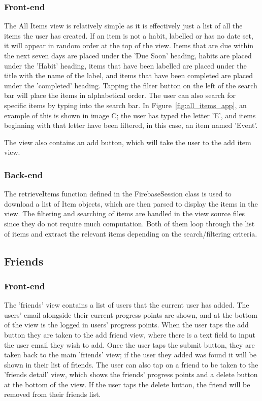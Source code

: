         \subsubsection{Front-end}
        The All Items view is relatively simple as it is effectively just a list of all the items the user has created.  If an item is not a habit, labelled or has no date set, it will appear in random order at the top of the view.  Items that are due within the next seven days are placed under the 'Due Soon' heading, habits are placed under the 'Habit' heading, items that have been labelled are placed under the title with the name of the label, and items that have been completed are placed under the 'completed' heading.  Tapping the filter button on the left of the search bar will place the items in alphabetical order.  The user can also search for specific items by typing into the search bar.  In Figure~\ref{fig:all_items_app}, an example of this is shown in image C; the user has typed the letter 'E', and items beginning with that letter have been filtered, in this case, an item named 'Event'.
        
        
        
        The view also contains an add button, which will take the user to the add item view.
        
        \subsubsection{Back-end}
        The retrieveItems function defined in the FirebaseSession class is used to download a list of Item objects, which are then parsed to display the items in the view.  The filtering and searching of items are handled in the view source files since they do not require much computation.  Both of them loop through the list of items and extract the relevant items depending on the search/filtering criteria.
        
        \subsection{Friends}
        \subsubsection{Front-end}
        The 'friends' view contains a list of users that the current user has added.  The users' email alongside their current progress points are shown, and at the bottom of the view is the logged in users' progress points.  When the user taps the add button they are taken to the add friend view, where there is a text field to input the user email they wish to add.  Once the user taps the submit button, they are taken back to the main 'friends' view; if the user they added was found it will be shown in their list of friends.  The user can also tap on a friend to be taken to the 'friends detail' view, which shows the friends' progress points and a delete button at the bottom of the view.  If the user taps the delete button, the friend will be removed from their friends list.
        

